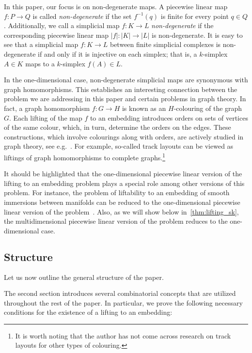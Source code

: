 \documentclass[a4paper,12pt,reqno,oneside]{amsart}
\theoremstyle{plain}
\theoremstyle{definition}
\theoremstyle{plain}
\newcommand{\from}{\colon}
\begin{document}
In this paper, our focus is on non-degenerate maps. A piecewise linear map $f \from P \to Q$ is
called \emph{non-degenerate} if the set $f^{-1}(q)$ is finite for every point $q \in
Q$. Additionally, we call a simplicial map $f \from K \to L$ \emph{non-degenerate} if the
corresponding piecewise linear map $|f| \from |K| \to |L|$ is non-degenerate. It is easy to see that
a simplicial map $f \from K \to L$ between finite simplicial complexes is non-degenerate if and only
if it is injective on each simplex; that is, a $k$-simplex $A \in K$ maps to a $k$-simplex
$f(A) \in L$.

In the one-dimensional case, non-degenerate simplicial maps are synonymous with graph
homomorphisms. This establishes an interesting connection between the problem we are addressing in
this paper and certain problems in graph theory. In fact, a graph homomorphism $f \from G \to H$ is
known as an $H$-colouring of the graph $G$. Each lifting of the map $f$ to an embedding introduces
orders on sets of vertices of the same colour, which, in turn, determine the orders on the
edges. These constructions, which involve colourings along with orders, are actively studied in
graph theory, see e.g.~\cite{track}. For example, so-called track layouts can be viewed as liftings
of graph homomorphisms to complete graphs.\footnote{It is worth noting that the author has not come
  across research on track layouts for other types of colouring.}

It should be highlighted that the one-dimensional piecewise linear version of the lifting to an
embedding problem plays a special role among other versions of this problem. For instance, the
problem of liftability to an embedding of smooth immersions between manifolds can be reduced to the
one-dimensional piecewise linear version of the problem~\cite{carter_saito_book,poen_fr}. Also, as
we will show below in~\cref{thm:lifting_sk}, the multidimensional piecewise linear version of the
problem reduces to the one-dimensional case.

\subsection{Structure}

Let us now outline the general structure of the paper.

The second section introduces several combinatorial concepts that are utilized throughout the rest
of the paper. In particular, we prove the following necessary conditions for the existence of a
lifting to an embedding:
\end{document}
